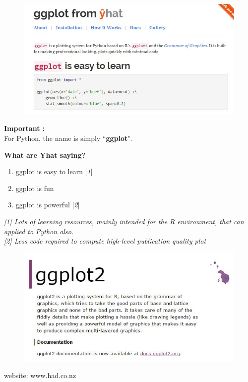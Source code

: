 \documentclass{beamer}
\begin{document}
\begin{frame}
	\begin{figure}
		\centering
		\includegraphics[width=1.1\linewidth]{ggplot-yhat}
	\end{figure}
	\Large
	\noindent \textbf{Important :} \\ For Python, the name is simply ``\textbf{ggplot}".
\end{frame}
\begin{frame}
	\Large
	\noindent\textbf{What are Yhat saying?}
	
	\begin{enumerate}
		\item ggplot is easy to learn [\textit{1}]
		\item ggplot is fun
		\item ggplot is powerful [\textit{2}]
	\end{enumerate}
	
	\begin{framed}
		\textit{[1] Lots of learning resources, mainly intended for the R environment, that can applied to Python also.}\\
		\bigskip
		\textit{[2] Less code required to compute high-level publication quality plot}
	\end{framed}
\end{frame}	
\begin{frame}
	\begin{figure}
\centering
\includegraphics[width=1.1\linewidth]{ggplot2-website}
\end{figure}
website: www.had.co.nz

\end{frame}
\end{document}
